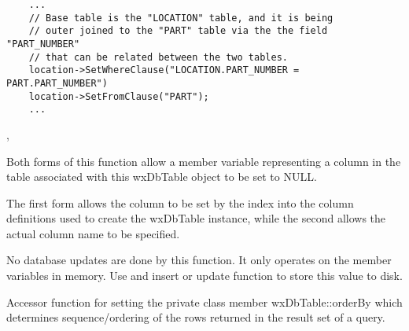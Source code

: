 
\begin{verbatim}
    ...
    // Base table is the "LOCATION" table, and it is being
    // outer joined to the "PART" table via the the field "PART_NUMBER"
    // that can be related between the two tables.
    location->SetWhereClause("LOCATION.PART_NUMBER = PART.PART_NUMBER")
    location->SetFromClause("PART");
    ...
\end{verbatim}


,

\label{wxdbtablesetcolnull}



Both forms of this function allow a member variable representing a column
in the table associated with this wxDbTable object to be set to NULL.

The first form allows the column to be set by the index into the column
definitions used to create the wxDbTable instance, while the second allows
the actual column name to be specified.




No database updates are done by this function.  It only operates on the
member variables in memory.  Use and insert or update function to store this
value to disk.

\label{wxdbtablesetorderbyclause}


Accessor function for setting the private class member wxDbTable::orderBy
which determines sequence/ordering of the rows returned in the result set
of a query.

